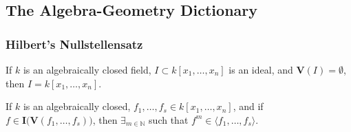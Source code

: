 \documentclass[crop=false,class=article,oneside]{standalone}
\begin{document}
    \subsection{The Algebra-Geometry Dictionary}
        \subsubsection{Hilbert's Nullstellensatz}
            \begin{theorem}
                If $k$ is an algebraically closed field,
                $I\subset k[x_1,\hdots ,x_n]$ is an ideal,
                and $\mathbf{V}(I)=\emptyset$,
                then $I=k[x_1,\hdots ,x_n]$.
            \end{theorem}
            \begin{theorem}
                If $k$ is an algebraically closed,
                $f_{1},\hdots,f_{s}\in k[x_{1},\hdots,x_{n}]$,
                and if
                $f\in\textbf{I}\big(\mathbf{V}(f_1,\hdots,f_s)\big)$,
                then $\exists_{m\in\mathbb{N}}$ such that
                $f^m \in \langle f_1,\hdots, f_s \rangle$.
            \end{theorem}
\end{document}
